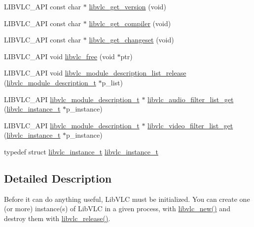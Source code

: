 \begin{DoxyCompactItemize}
\item 
L\+I\+B\+V\+L\+C\+\_\+\+A\+PI const char $\ast$ \hyperlink{group__libvlc__core_ga950b9828d1391f06fe56ce5d03483b9f}{libvlc\+\_\+get\+\_\+version} (void)
\item 
L\+I\+B\+V\+L\+C\+\_\+\+A\+PI const char $\ast$ \hyperlink{group__libvlc__core_ga7cac13c14411e4764f119a368af78c1b}{libvlc\+\_\+get\+\_\+compiler} (void)
\item 
L\+I\+B\+V\+L\+C\+\_\+\+A\+PI const char $\ast$ \hyperlink{group__libvlc__core_gad308de3b963863e211c952636b2bde40}{libvlc\+\_\+get\+\_\+changeset} (void)
\item 
L\+I\+B\+V\+L\+C\+\_\+\+A\+PI void \hyperlink{group__libvlc__core_gab42b9c99de37cddea9b4e817cf14524f}{libvlc\+\_\+free} (void $\ast$ptr)
\item 
L\+I\+B\+V\+L\+C\+\_\+\+A\+PI void \hyperlink{group__libvlc__core_ga6f077c04819910cf821e107be8b258a9}{libvlc\+\_\+module\+\_\+description\+\_\+list\+\_\+release} (\hyperlink{structlibvlc__module__description__t}{libvlc\+\_\+module\+\_\+description\+\_\+t} $\ast$p\+\_\+list)
\item 
L\+I\+B\+V\+L\+C\+\_\+\+A\+PI \hyperlink{structlibvlc__module__description__t}{libvlc\+\_\+module\+\_\+description\+\_\+t} $\ast$ \hyperlink{group__libvlc__core_ga2a9b8d8c7282b7602aa6a9ea4550cf18}{libvlc\+\_\+audio\+\_\+filter\+\_\+list\+\_\+get} (\hyperlink{group__libvlc__core_ga316d739a80da4678206c79f4d6c2e284}{libvlc\+\_\+instance\+\_\+t} $\ast$p\+\_\+instance)
\item 
L\+I\+B\+V\+L\+C\+\_\+\+A\+PI \hyperlink{structlibvlc__module__description__t}{libvlc\+\_\+module\+\_\+description\+\_\+t} $\ast$ \hyperlink{group__libvlc__core_ga03f3afbc3208d6fa817a80359297c7c8}{libvlc\+\_\+video\+\_\+filter\+\_\+list\+\_\+get} (\hyperlink{group__libvlc__core_ga316d739a80da4678206c79f4d6c2e284}{libvlc\+\_\+instance\+\_\+t} $\ast$p\+\_\+instance)
\end{DoxyCompactItemize}
\begin{DoxyCompactItemize}
\item 
typedef struct \hyperlink{group__libvlc__core_ga316d739a80da4678206c79f4d6c2e284}{libvlc\+\_\+instance\+\_\+t} \hyperlink{group__libvlc__core_ga316d739a80da4678206c79f4d6c2e284}{libvlc\+\_\+instance\+\_\+t}
\end{DoxyCompactItemize}


\subsection{Detailed Description}
Before it can do anything useful, Lib\+V\+LC must be initialized. You can create one (or more) instance(s) of Lib\+V\+LC in a given process, with \hyperlink{group__libvlc__core_ga1ecba605b37df9e62d2f8c0290ef3893}{libvlc\+\_\+new()} and destroy them with \hyperlink{group__libvlc__core_ga42f80821f3b5e2e9a1fe38c96d40ee71}{libvlc\+\_\+release()}.

